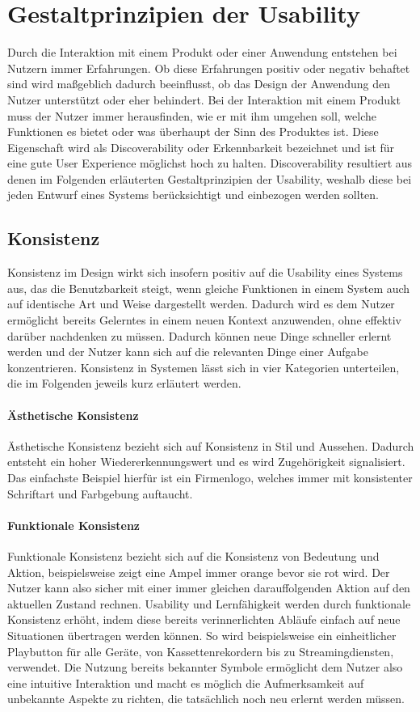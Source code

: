 \section{Gestaltprinzipien der Usability}
Durch die Interaktion mit einem Produkt oder einer Anwendung entstehen bei Nutzern immer Erfahrungen.
Ob diese Erfahrungen positiv oder negativ behaftet sind wird maßgeblich dadurch beeinflusst, ob das Design der Anwendung den Nutzer unterstützt oder eher behindert.
Bei der Interaktion mit einem Produkt muss der Nutzer immer herausfinden, wie er mit ihm umgehen soll, welche Funktionen es bietet oder was überhaupt der Sinn des Produktes ist.
Diese Eigenschaft wird als Discoverability oder Erkennbarkeit bezeichnet und ist für eine gute User Experience möglichst hoch zu halten.
Discoverability resultiert aus denen im  Folgenden erläuterten Gestaltprinzipien der Usability, weshalb diese bei jeden Entwurf eines Systems berücksichtigt und einbezogen werden sollten\cite{Norman.2016}.

\subsection*{Konsistenz}
Konsistenz im Design wirkt sich insofern positiv auf die Usability eines Systems aus, das die Benutzbarkeit steigt, wenn gleiche Funktionen in einem System auch auf identische Art und Weise dargestellt werden.
Dadurch wird es dem Nutzer ermöglicht bereits Gelerntes in einem neuen Kontext anzuwenden, ohne effektiv darüber nachdenken zu müssen.
Dadurch können neue Dinge schneller erlernt werden und der Nutzer kann sich auf die relevanten Dinge einer Aufgabe konzentrieren.
Konsistenz in Systemen lässt sich in vier Kategorien unterteilen, die im Folgenden jeweils kurz erläutert werden.

\paragraph{Ästhetische Konsistenz}
Ästhetische Konsistenz bezieht sich auf Konsistenz in Stil und Aussehen. Dadurch entsteht ein hoher Wiedererkennungswert und es wird Zugehörigkeit signalisiert. Das einfachste Beispiel hierfür ist ein Firmenlogo, welches immer mit konsistenter Schriftart und Farbgebung auftaucht.

\paragraph{Funktionale Konsistenz}
Funktionale Konsistenz bezieht sich auf die Konsistenz von Bedeutung und Aktion, beispielsweise zeigt eine Ampel immer orange bevor sie rot wird. Der Nutzer kann also sicher mit einer immer gleichen darauffolgenden Aktion auf den aktuellen Zustand rechnen. 
Usability und Lernfähigkeit werden durch funktionale Konsistenz erhöht, indem diese bereits verinnerlichten Abläufe einfach auf neue Situationen übertragen werden können. So wird beispielsweise ein einheitlicher Playbutton für alle Geräte, von Kassettenrekordern bis zu Streamingdiensten, verwendet.
Die Nutzung bereits bekannter Symbole ermöglicht dem Nutzer also eine intuitive Interaktion und macht es möglich die Aufmerksamkeit auf unbekannte Aspekte zu richten, die tatsächlich noch neu erlernt werden müssen.


